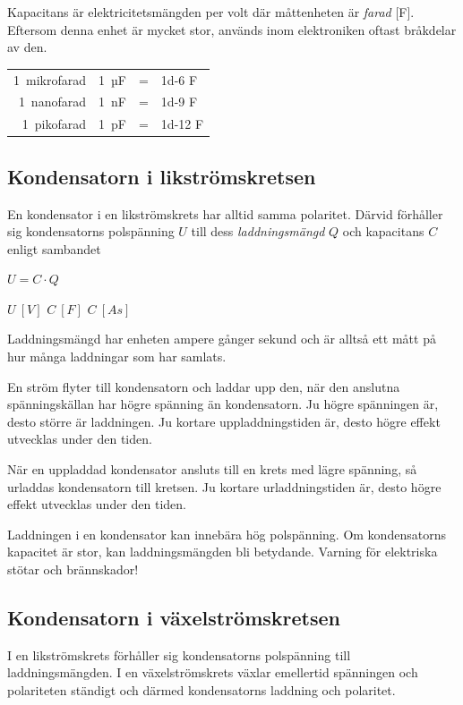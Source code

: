 Kapacitans är elektricitetsmängden per volt där måttenheten är \emph{farad} [F].
Eftersom denna enhet är mycket stor, används inom elektroniken oftast bråkdelar
av den.

\begin{tabular}{rlcl}
 \SI{1}{mikrofarad} & \SI{1}{µF} &=& \num{1d-6} F \\
 \SI{1}{nanofarad}  & \SI{1}{nF}        &=& \num{1d-9} F \\
 \SI{1}{pikofarad}  & \SI{1}{pF}        &=& \num{1d-12} F
\end{tabular}

\subsection{Kondensatorn i likströmskretsen}

En kondensator i en likströmskrets har alltid samma polaritet.
Därvid förhåller sig kondensatorns polspänning \(U\) till dess
\emph{laddningsmängd} \(Q\) och kapacitans \(C\) enligt sambandet

\(U = C \cdot Q\)

\(U\ [V]\) \(C\ [F]\) \(C\ [As]\)

Laddningsmängd har enheten ampere gånger sekund och är alltså ett mått på hur
många laddningar som har samlats.

En ström flyter till kondensatorn och laddar upp den, när den anslutna
spänningskällan har högre spänning än kondensatorn. Ju högre spänningen är,
desto större är laddningen. Ju kortare uppladdningstiden är, desto högre effekt
utvecklas under den tiden.

När en uppladdad kondensator ansluts till en krets med lägre spänning, så
urladdas kondensatorn till kretsen. Ju kortare urladdningstiden är, desto högre
effekt utvecklas under den tiden.

Laddningen i en kondensator kan innebära hög polspänning. Om kondensatorns
kapacitet är stor, kan laddningsmängden bli betydande. Varning för elektriska
stötar och brännskador!

\subsection{Kondensatorn i växelströmskretsen}

I en likströmskrets förhåller sig kondensatorns polspänning till
laddningsmängden. I en växelströmskrets växlar emellertid spänningen och
polariteten ständigt och därmed kondensatorns laddning och polaritet.

